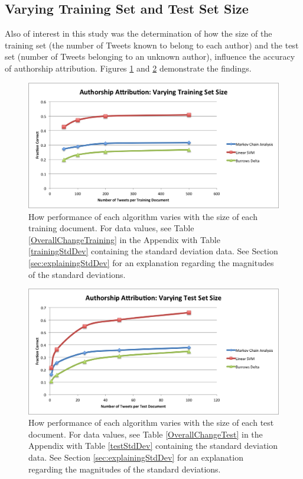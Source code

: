\documentclass[pageno]{jpaper}
\begin{document}
\subsection{Varying Training Set and Test Set Size}
\label{sec:resultsVaryTrainAndTest}
Also of interest in this study was the determination of how the size of the training set (the number of Tweets known to belong to each author) and the test set (number of Tweets belonging to an unknown author), influence the accuracy of authorship attribution.  Figures \ref{fig:GeneralVaryingTraining} and \ref{fig:GeneralVaryingTest} demonstrate the findings.  
\begin{figure}[h!]
\begin{center}
\includegraphics*[scale=.8]{GeneralVaryingTrainingSetSize}
\end{center}
\caption{How performance of each algorithm varies with the size of each training document.  For data values, see Table \ref{OverallChangeTraining} in the Appendix with Table \ref{trainingStdDev} containing the standard deviation data.  See Section \ref{sec:explainingStdDev} for an explanation regarding the magnitudes of the standard deviations.}
\label{fig:GeneralVaryingTraining}
\end{figure}
\begin{figure}[h!]
\begin{center}
\includegraphics*[scale=.8]{GeneralVaryingTestSetSize}
\end{center}
\caption{How performance of each algorithm varies with the size of each test document.  For data values, see Table \ref{OverallChangeTest} in the Appendix with Table \ref{testStdDev} containing the standard deviation data.  See Section \ref{sec:explainingStdDev} for an explanation regarding the magnitudes of the standard deviations.}
\label{fig:GeneralVaryingTest}
\end{figure}
\end{document}
